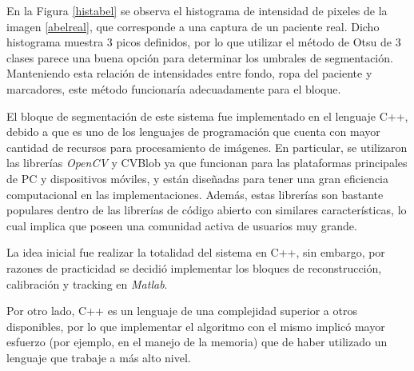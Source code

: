 En la Figura \ref{histabel} se observa el histograma de intensidad de pixeles de la imagen \ref{abelreal}, que corresponde a una captura de un paciente real. Dicho histograma muestra 3 picos definidos, por lo que utilizar el método de Otsu de 3 clases parece una buena opción para determinar los umbrales de segmentación. Manteniendo esta relación de intensidades entre fondo, ropa del paciente y marcadores, este método funcionaría adecuadamente para el bloque.


El bloque de segmentación de este sistema fue implementado en el lenguaje C++, debido a que es uno de los lenguajes de programación que cuenta con mayor cantidad de recursos para procesamiento de imágenes. En particular, se utilizaron las librerías \emph{OpenCV} \cite{opencv} y CVBlob \cite{cvblob} ya que funcionan para las plataformas principales de PC y dispositivos móviles, y están diseñadas para tener una gran eficiencia computacional en las implementaciones. Además, estas librerías son bastante populares dentro de las librerías de código abierto con similares características, lo cual implica que poseen una comunidad activa de usuarios muy grande.

La idea inicial fue realizar la totalidad del sistema en C++, sin embargo, por razones de practicidad se decidió implementar los bloques de reconstrucción, calibración y tracking en \emph{Matlab}.

Por otro lado, C++ es un lenguaje de una complejidad superior a otros disponibles, por lo que implementar el algoritmo con el mismo implicó mayor esfuerzo (por ejemplo, en el manejo de la memoria) que de haber utilizado un lenguaje que trabaje a más alto nivel.

